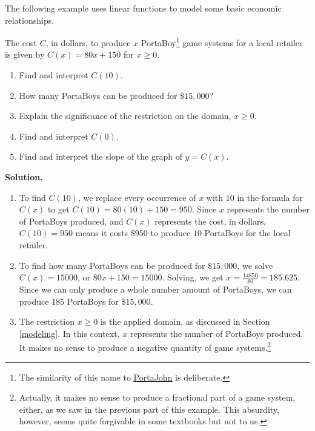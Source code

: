 The following example uses linear functions to model some basic economic relationships.

\begin{ex} \label{PortaBoyCost} The cost $C$, in dollars, to produce $x$ PortaBoy\footnote{The similarity of this name to \href{http://www.toilets.com}{\underline{PortaJohn}} is deliberate.} game systems for a local retailer is given by   $C(x) = 80x + 150$ for $x \geq 0$.  

\begin{enumerate}

\item Find and interpret $C(10)$.

\item How many PortaBoys can be produced for $\$15,\! 000$?  

\item  Explain the significance of the restriction on the domain, $x \geq 0$.

\item  Find and interpret $C(0)$.

\item  Find and interpret the slope of the graph of  $y = C(x)$.


\end{enumerate}

\smallskip

{\bf Solution.}

\begin{enumerate}

\item  To find $C(10)$, we replace every occurrence of $x$ with $10$ in the formula for $C(x)$ to get $C(10) = 80(10)+150 = 950$.  Since $x$ represents the number of PortaBoys produced, and $C(x)$ represents the cost, in dollars, $C(10) = 950$ means it costs $\$950$ to produce $10$ PortaBoys for the local retailer.

\item  To find how many PortaBoys can be produced for $\$15, \! 000$, we solve $C(x) = 15000$, or $80x+150 = 15000$.  Solving, we get  $x = \frac{14850}{80} = 185.625$. Since we can only produce a whole number amount of PortaBoys, we can produce $185$ PortaBoys for $\$15, \! 000$. 


\item  The restriction $x \geq 0$ is the applied domain, as discussed in Section \ref{modeling}.  In this context, $x$ represents the number of PortaBoys produced.  It makes no sense to produce a negative quantity of game systems.\footnote{Actually, it makes no sense to produce a fractional part of a game system, either, as we saw in the previous part of this example.  This absurdity, however, seems quite forgivable in some textbooks but not to us.}


\end{enumerate}
\end{ex}
